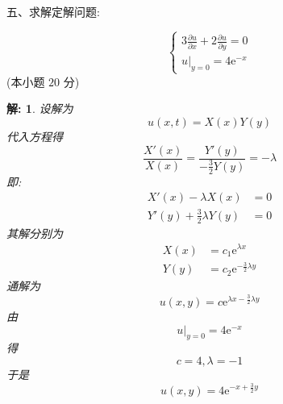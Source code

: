 \documentclass{article}
\theoremstyle{nonumberplain}
\newtheorem{solution}{\textcolor{gr}{解:}}
\newcommand{\ee}{\mathrm{e}}
\begin{document}
    \begin{flushleft}
    	五、求解定解问题:
    \end{flushleft}
    \begin{equation*}
    \begin{cases}
    3\frac{\partial u}{\partial x}+2\frac{\partial u}{\partial y}=0\\
    u|_{y=0}=4\ee^{-x}
    \end{cases}
    \end{equation*}(本小题 $20$ 分)
    \begin{solution}
    	设解为
    	\begin{equation*}
    		u(x,t)=X(x)Y(y)\tag*{$\cdots\cdots2$分}
    	\end{equation*}
    	代入方程得
    	\begin{equation*}
    		\frac{X'(x)}{X(x)}=\frac{Y'(y)}{-\frac{3}{2}Y(y)}=-\lambda\tag*{$\cdots\cdots2$分}
    	\end{equation*}
    	即:
    	\begin{align*}
    		X'(x)-\lambda X(x)&=0\\
    		Y'(y)+\frac{3}{2}\lambda Y(y)&=0\tag*{$\cdots\cdots4$分}
    	\end{align*}
    	其解分别为
    	\begin{align*}
    		X(x)&=c_{1}\ee^{\lambda x}\\
    		Y(y)&=c_{2}\ee^{-\frac{3}{2}\lambda y}\tag*{$\cdots\cdots2$分}
    	\end{align*}
    	通解为
    	\begin{equation*}
    		u(x,y)=c\ee^{\lambda x-\frac{3}{2}\lambda y}\tag*{$\cdots\cdots2$分}
    	\end{equation*}
    	由
    	\begin{equation*}
    		u|_{y=0}=4\ee^{-x}\tag*{$\cdots\cdots2$分}
    	\end{equation*}
    	得
    	\begin{equation*}
    		c=4,\lambda=-1\tag*{$\cdots\cdots2$分}
    	\end{equation*}
    	于是
    	\begin{equation*}
    		u(x,y)=4\ee^{-x+\frac{3}{2}y}\tag*{$\cdots\cdots4$分}
    	\end{equation*}
    \end{solution}
\end{document}

